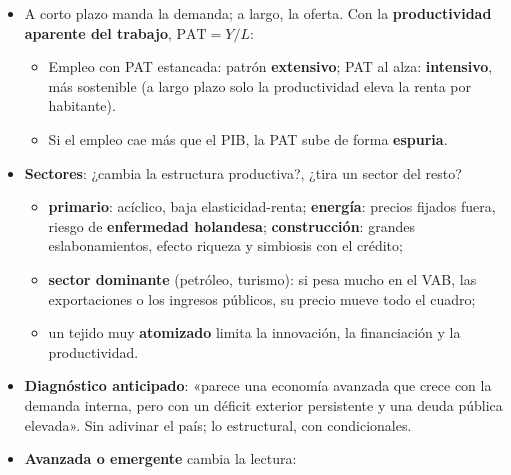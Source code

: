 \documentclass{article}
\begin{document}
\begin{columnas}
\begin{itemize}[itemsep=1.5pt]
\item A corto plazo manda la demanda; a largo, la oferta. Con la \textbf{productividad aparente del trabajo}, $\mathrm{PAT}=Y/L$:
  \begin{itemize}
  \item Empleo con PAT estancada: patrón \textbf{extensivo}; PAT al alza: \textbf{intensivo}, más sostenible (a largo plazo solo la productividad eleva la renta por habitante).
  \item Si el empleo cae más que el PIB, la PAT sube de forma \textbf{espuria}.
  \end{itemize}
\item \textbf{Sectores}: ¿cambia la estructura productiva?, ¿tira un sector del resto?
  \begin{itemize}
  \item \textbf{primario}: acíclico, baja elasticidad-renta; \textbf{energía}: precios fijados fuera, riesgo de \textbf{enfermedad holandesa}; \textbf{construcción}: grandes eslabonamientos, efecto riqueza y simbiosis con el crédito;
  \item \textbf{sector dominante} (petróleo, turismo): si pesa mucho en el VAB, las exportaciones o los ingresos públicos, su precio mueve todo el cuadro;
  \item un tejido muy \textbf{atomizado} limita la innovación, la financiación y la productividad.
  \end{itemize}
\item \textbf{Diagnóstico anticipado}: «parece una economía avanzada que crece con la demanda interna, pero con un déficit exterior persistente y una deuda pública elevada». Sin adivinar el país; lo estructural, con condicionales.
\end{itemize}
\noindent\begin{minipage}{\linewidth}
\begin{itemize}[itemsep=1.5pt]
\item \textbf{Avanzada o emergente} cambia la lectura:
\end{itemize}
{\footnotesize\setlength{\tabcolsep}{3pt}\renewcommand{\arraystretch}{1.1}
\begin{tabularx}{\linewidth}{>{\raggedright\arraybackslash}p{0.2\linewidth}>{\raggedright\arraybackslash}p{0.36\linewidth}>{\raggedright\arraybackslash}X}

\end{tabularx}}
\end{minipage}
\end{columnas}
\end{document}
